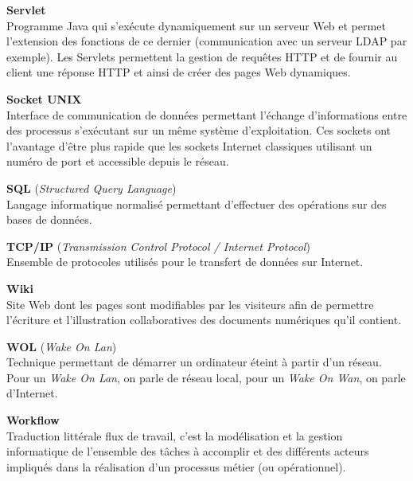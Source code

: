 \vspace{0.5cm}

\textbf{Servlet}\\
Programme Java qui s'ex\'ecute dynamiquement sur un serveur Web et permet l'extension des fonctions de ce dernier (communication avec un serveur LDAP par exemple).
Les Servlets permettent la gestion de requ\^etes HTTP et de fournir au client une r\'eponse HTTP et ainsi de cr\'eer des pages Web dynamiques.

\vspace{0.5cm}

\textbf{Socket UNIX}\\
Interface de communication de donn\'ees permettant l'\'echange d'informations entre des processus s'ex\'ecutant sur un m\^eme syst\`eme d'exploitation.
Ces sockets ont l'avantage d'\^etre plus rapide que les sockets Internet classiques utilisant un num\'ero de port et accessible depuis le r\'eseau.

\vspace{0.5cm}

\textbf{SQL} (\textit{Structured Query Language})\\
Langage informatique normalis\'e permettant d'effectuer des op\'erations sur des bases de donn\'ees.

\vspace{0.5cm}

\textbf{TCP/IP} (\textit{Transmission Control Protocol / Internet Protocol})\\
Ensemble de protocoles utilis\'es pour le transfert de donn\'ees sur Internet.

\vspace{0.5cm}

\textbf{Wiki}\\
Site Web dont les pages sont modifiables par les visiteurs afin de permettre l'\'ecriture et l'illustration collaboratives des documents num\'eriques qu'il contient.

\vspace{0.5cm}

\textbf{WOL} (\textit{Wake On Lan})\\
Technique permettant de d\'emarrer un ordinateur \'eteint \`a partir d'un r\'eseau. 
Pour un \textit{Wake On Lan}, on parle de r\'eseau local, pour un \textit{Wake On Wan}, on parle d'Internet.

\vspace{0.5cm}

\textbf{Workflow}\\
Traduction litt\'erale \og{}flux de travail\fg{}, c'est la mod\'elisation et la gestion informatique de l'ensemble des t\^aches \`a accomplir et des diff\'erents acteurs impliqu\'es dans la r\'ealisation d'un processus m\'etier (ou op\'erationnel).

\clearpage
